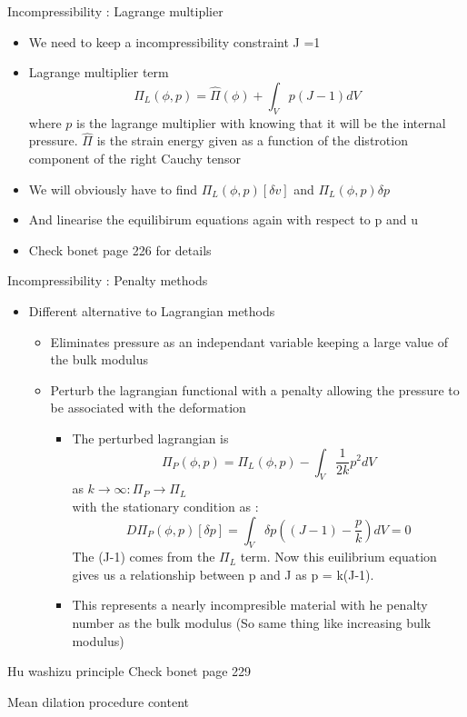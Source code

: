 	\begin{frame}{Incompressibility : Lagrange multiplier}
		\begin{itemize}
			\item We need to keep a incompressibility constraint J =1
			\item Lagrange multiplier term
			\begin{equation}
				\Pi_L(\phi,p) = \hat{\Pi}(\phi) + \int_V p(J-1) dV
			\end{equation}
			where $p$ is the lagrange multiplier with knowing that it will be the internal pressure. $\hat{\Pi}$ is the strain energy given as a function of the distrotion component of the right Cauchy tensor
			\item We will obviously have to find $\Pi_L(\phi,p)[\delta v ]$ and $\Pi_L(\phi,p)\delta p$
			\item And linearise the equilibirum equations again with respect to p and u
			\item Check bonet page 226 for details
		\end{itemize}
	\end{frame}


	\begin{frame}{Incompressibility : Penalty methods}
		\begin{itemize}
			\item Different alternative to Lagrangian methods
			\begin{itemize}
				\item Eliminates pressure as an independant variable keeping a large value of the bulk modulus
				\item Perturb the lagrangian functional with a penalty allowing the pressure to be associated with the deformation
				\begin{itemize}
					\item The perturbed lagrangian is 
					\begin{equation}
						\Pi_P(\phi,p) = \Pi_L(\phi,p) - \int_V \frac{1}{2k}p^2 dV
					\end{equation}
					as $k \rightarrow \infty : \Pi_P \rightarrow \Pi_L$ \\
					with the stationary condition as :
					\begin{equation}
					D\Pi_P(\phi,p)[\delta p] = \int_V \delta p \left((J-1)-\frac{p}{k} \right)dV = 0
					\end{equation}
					The (J-1) comes from the $\Pi_L$ term. Now this euilibrium equation gives us a relationship between p and J as p = k(J-1).
					\item This represents a nearly incompresible material with he penalty number as the bulk modulus (So same thing like increasing bulk modulus)
				\end{itemize}
				
			\end{itemize}
			
		\end{itemize}
	\end{frame}


	\begin{frame}{Hu washizu principle}
		Check bonet page 229
	\end{frame}

	
	\begin{frame}{Mean dilation procedure}
		content
	\end{frame}